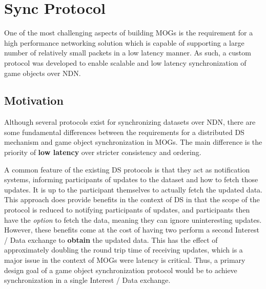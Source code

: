 \section{\game{} Sync Protocol}\label{sec:des:sync-protocol}
One of the most challenging aspects of building MOGs is the requirement for a high performance networking solution which is capable of supporting a large number of relatively small packets in a low latency manner. As such, a custom protocol was developed to enable scalable and low latency synchronization of game objects over NDN.

\subsection{Motivation}
Although several protocols exist for synchronizing datasets over NDN, there are some fundamental differences between the requirements for a distributed DS mechanism and game object synchronization in MOGs. The main difference is the priority of \textbf{low latency} over stricter consistency and ordering.

A common feature of the existing DS protocols is that they act as notification systems, informing participants of updates to the dataset and how to fetch those updates. It is up to the participant themselves to actually fetch the updated data. This approach does provide benefits in the context of DS in that the scope of the protocol is reduced to notifying participants of updates, and participants then have the \textit{option} to fetch the data, meaning they can ignore uninteresting updates. However, these benefits come at the cost of having two perform a second Interest / Data exchange to \textbf{obtain} the updated data. This has the effect of approximately doubling the round trip time of receiving updates, which is a major issue in the context of MOGs were latency is critical. Thus, a primary design goal of a game object synchronization protocol would be to achieve synchronization in a single Interest / Data exchange.

